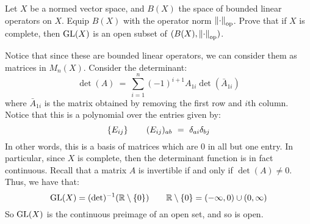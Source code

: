 %
%
%
%
%


\newpage
\label{q16}
\begin{qu}[num=16]
    Let $ X $ be a normed vector space, and $ B(X) $ the space of bounded linear
    operators on $ X $. Equip $ B(X) $ with the operator norm
    $ \left\|\cdot\right\|_{\textrm{op}} $. \vsp
    Prove that if $ X $ is complete, then $ \operatorname{GL}(X) $ is an open subset of
    $ (B(X), \left\|\cdot\right\|_{\textrm{op}}) $.
\end{qu}

\begin{soln}
    Notice that since these are bounded linear operators, we can consider them
    as matrices in $ M_{n}(X) $. Consider the determinant:
    \begin{equation*}
        \det(A) \ = \ \sum_{i=1}^{n}(-1)^{i+1}A_{1i}\det(\bar{A}_{1i})
    \end{equation*}
    where $ \bar{A}_{1i} $ is the matrix obtained by removing the first row and
    $ i $th column. Notice that this is a polynomial over the entries given by:
    \begin{equation*}
        \set{E_{ij}} \qquad (E_{ij})_{ab} \ = \ \delta_{ai}\delta_{bj}
    \end{equation*}
    In other words, this is a basis of matrices which are 0 in all but one entry.
    In particular, since $ X $ is complete, then the determinant function is in
    fact continuous. \vsp
    Recall that a matrix $ A $ is invertible if and only if $ \det(A) \neq 0 $.
    Thus, we have that:
    \begin{equation*}
        \operatorname{GL}(X) = (\det)^{-1}(\mathbb{R}\setminus\left\{{0}\right\}) \qquad
        \mathbb{R}\setminus\left\{{0}\right\} = (-\infty,0) \cup (0,\infty)
    \end{equation*}
    So $ \operatorname{GL}(X) $ is the continuous preimage of an open set, and so is open.
\end{soln}


